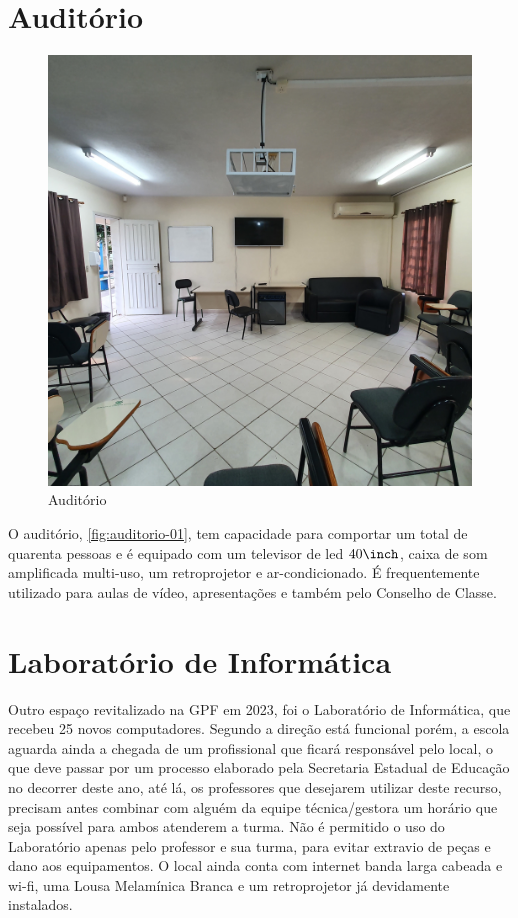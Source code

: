 \section{Auditório} %
\label{sec:Auditório}
\setlength\intextsep{0pt}
\begin{figure}
	\centering
	\caption{Auditório}
	\label{fig:auditorio-01}
	\includegraphics[width=.45\textwidth]{assets/auditorio-01.jpg}
\end{figure}
O auditório, \autoref{fig:auditorio-01}, tem capacidade para comportar um total de quarenta pessoas e é equipado com um televisor de led $40\inch$, caixa de som amplificada multi-uso, um retroprojetor e ar-condicionado. É frequentemente utilizado para aulas de vídeo, apresentações e também pelo Conselho de Classe.

\section{Laboratório de Informática} %
\label{sec:Laboratório de Informática}
Outro espaço revitalizado na \ac{GPF} em 2023, foi o Laboratório de Informática, que recebeu 25 novos computadores. Segundo a direção está funcional porém, a escola aguarda ainda a chegada de um profissional que ficará responsável pelo local, o que deve passar por um processo elaborado pela Secretaria Estadual de Educação no decorrer deste ano, até lá, os professores que desejarem utilizar deste recurso, precisam antes combinar com alguém da equipe técnica/gestora um horário que seja possível para ambos atenderem a turma. Não é permitido o uso do Laboratório apenas pelo professor e sua turma, para evitar extravio de peças e dano aos equipamentos. O local ainda conta com internet banda larga cabeada e wi-fi, uma Lousa Melamínica Branca e um retroprojetor já devidamente instalados.

